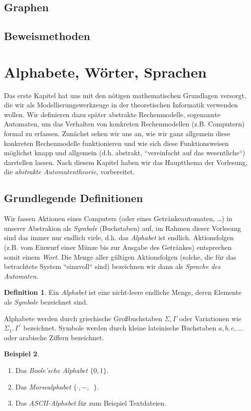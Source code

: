 \documentclass[11pt, a4paper]{article}
\theoremstyle{definition}
\newtheorem{definition}{Definition}[section]
\newtheorem{example}[definition]{Beispiel}
\theoremstyle{plain}
\numberwithin{equation}{section}
\begin{document}
\subsection{Graphen}\label{sec:pre_graphs}

\subsection{Beweismethoden}\label{sec:pre_proofs}



\newpage
\section{Alphabete, Wörter, Sprachen}\label{sec:awl}
Das erste Kapitel hat uns mit den nötigen mathematischen Grundlagen versorgt, die wir als Modellierungswerkzeuge in der theoretischen Informatik verwenden wollen. Wir definieren dazu später abstrakte Rechenmodelle, sogenannte Automaten, um das Verhalten von konkreten Rechenmodellen (z.B. Computern) formal zu erfassen. Zunächst sehen wir uns an, wie wir ganz allgemein diese konkreten Rechenmodelle funktionieren und wie sich diese Funktionsweisen möglichst knapp und allgemein (d.h. abstrakt, ``vereinfacht auf das wesentliche``) darstellen lassen. Nach diesem Kapitel haben wir das Hauptthema der Vorlesung, die \textit{abstrakte Automatentheorie}, vorbereitet.

\subsection{Grundlegende Definitionen}\label{sec:awl_def}
Wir fassen Aktionen eines Computers (oder eines Getränkeautomaten, \ldots) in unserer Abstrakion als \textit{Symbole} (Buchstaben) auf, im Rahmen dieser Vorlesung sind das immer nur endlich viele, d.h. das \textit{Alphabet} ist endlich. Aktionsfolgen (z.B. vom Einwurf einer Münze bis zur Ausgabe des Getränkes) entsprechen somit einem \textit{Wort}. Die Menge aller gültigen Aktionsfolgen (solche, die für das betrachtete System ``sinnvoll`` sind) bezeichnen wir dann als \textit{Sprache des Automaten}.
\begin{definition}
	Ein \textit{Alphabet} ist eine nicht-leere endliche Menge, deren Elemente als \textit{Symbole} bezeichnet sind.
\end{definition}
Alphabete werden durch griechische Großbuchstaben \( \Sigma, \Gamma \) oder Variationen wie \( \Sigma_1, \Gamma^\prime \) bezeichnet. Symbole werden durch kleine lateinische Buchstaben \( a, b, c, \ldots \) oder arabische Ziffern bezeichnet.
\begin{example}
	\
	\begin{enumerate}
		\item Das \textit{Boole'sche Alphabet} \( \{ 0, 1 \} \).
		\item Das \textit{Morsealphabet} \( \{ \cdot, -, \,\,\, \} \).
		\item Das \textit{ASCII-Alphabet} für zum Beispiel Textdateien.
	\end{enumerate}
\end{example}
\end{document}
